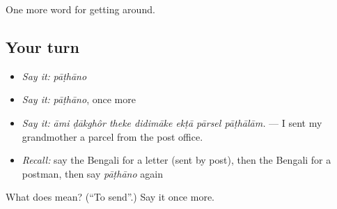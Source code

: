 \begin{grammarlens}[title={What you've built}]
One more word for getting around.
\end{grammarlens}

\subsection*{Your turn}
\begin{itemize}
\raggedright
  \item \emph{Say it:} \emph{pāṭhāno}
  \item \emph{Say it:} \emph{pāṭhāno}, once more
  \item \emph{Say it:} \emph{āmi ḍākghôr theke didimāke ekṭā pārsel pāṭhālām.} — I sent my grandmother a parcel from the post office.
  \item \emph{Recall:} say the Bengali for a letter (sent by post), then the Bengali for a postman, then say \emph{pāṭhāno} again
\end{itemize}

\begin{tcolorbox}[breakable,colback=teal!4,colframe=teal!35!black,title={Before you move on}]
What does  mean? (\textquotedblleft{}To send\textquotedblright{}.) Say it once more.
\end{tcolorbox}
